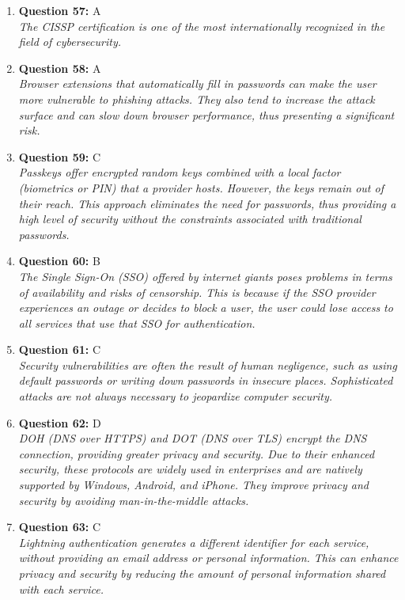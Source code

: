 \documentclass[12pt,a4paper]{article}
\begin{document}
\begin{enumerate}
\item \textbf{Question 57:} A
\\ \textit{The CISSP certification is one of the most internationally recognized in the field of cybersecurity.}

\item \textbf{Question 58:} A
\\ \textit{Browser extensions that automatically fill in passwords can make the user more vulnerable to phishing attacks. They also tend to increase the attack surface and can slow down browser performance, thus presenting a significant risk.}

\item \textbf{Question 59:} C
\\ \textit{Passkeys offer encrypted random keys combined with a local factor (biometrics or PIN) that a provider hosts. However, the keys remain out of their reach. This approach eliminates the need for passwords, thus providing a high level of security without the constraints associated with traditional passwords.}

\item \textbf{Question 60:} B
\\ \textit{The Single Sign-On (SSO) offered by internet giants poses
problems in terms of availability and risks of censorship.
This is because if the SSO provider experiences an outage
or decides to block a user, the user could lose access to
all services that use that SSO for authentication.}

\item \textbf{Question 61:} C
\\ \textit{Security vulnerabilities are often the result of human
negligence, such as using default passwords or writing down
passwords in insecure places. Sophisticated attacks are not
always necessary to jeopardize computer security.}

\item \textbf{Question 62:} D
\\ \textit{DOH (DNS over HTTPS) and DOT (DNS over TLS) encrypt the DNS connection, providing greater privacy and security. Due to their enhanced security, these protocols are widely used in enterprises and are natively supported by Windows, Android, and iPhone. They improve privacy and security by avoiding man-in-the-middle attacks.}

\item \textbf{Question 63:} C
\\ \textit{Lightning authentication generates a different identifier for each service, without providing an email address or personal information. This can enhance privacy and security by reducing the amount of personal information shared with each service.}


\end{enumerate}
\end{document}
